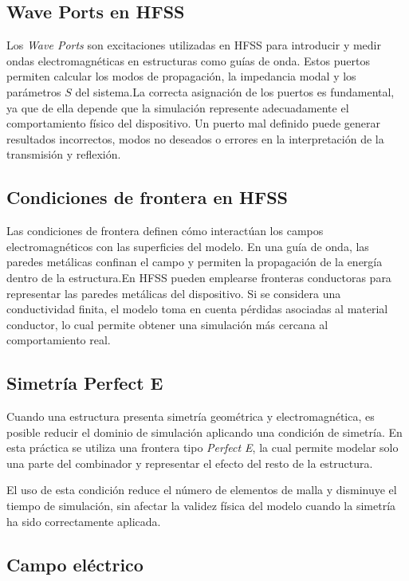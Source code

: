 \subsection{Wave Ports en HFSS}

Los \textit{Wave Ports} son excitaciones utilizadas en HFSS para introducir y medir ondas electromagnéticas en estructuras como guías de onda. Estos puertos permiten calcular los modos de propagación, la impedancia modal y los parámetros $S$ del sistema.La correcta asignación de los puertos es fundamental, ya que de ella depende que la simulación represente adecuadamente el comportamiento físico del dispositivo. Un puerto mal definido puede generar resultados incorrectos, modos no deseados o errores en la interpretación de la transmisión y reflexión.

\subsection{Condiciones de frontera en HFSS}

Las condiciones de frontera definen cómo interactúan los campos electromagnéticos con las superficies del modelo. En una guía de onda, las paredes metálicas confinan el campo y permiten la propagación de la energía dentro de la estructura.En HFSS pueden emplearse fronteras conductoras para representar las paredes metálicas del dispositivo. Si se considera una conductividad finita, el modelo toma en cuenta pérdidas asociadas al material conductor, lo cual permite obtener una simulación más cercana al comportamiento real.

\subsection{Simetría Perfect E}

Cuando una estructura presenta simetría geométrica y electromagnética, es posible reducir el dominio de simulación aplicando una condición de simetría. En esta práctica se utiliza una frontera tipo \textit{Perfect E}, la cual permite modelar solo una parte del combinador y representar el efecto del resto de la estructura.

El uso de esta condición reduce el número de elementos de malla y disminuye el tiempo de simulación, sin afectar la validez física del modelo cuando la simetría ha sido correctamente aplicada.

\subsection{Campo eléctrico}

